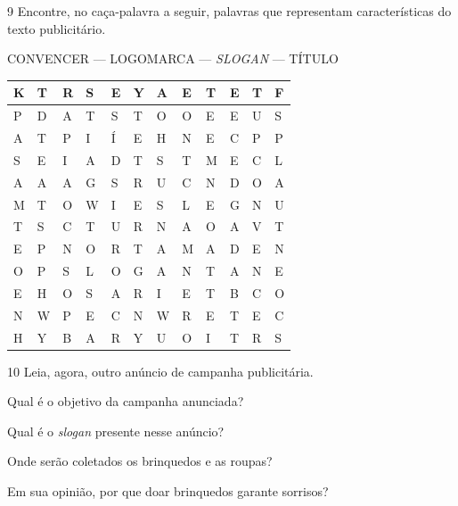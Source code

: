 \num{9} Encontre, no caça-palavra a seguir, palavras que representam
características do texto publicitário.

CONVENCER --- LOGOMARCA --- \textit{SLOGAN} --- TÍTULO

\begin{longtable}[]{@{}llllllllllll@{}}
\toprule
K & T & R & S & E & Y & A & E & T & E & T & F\tabularnewline
\midrule
\endhead
P & D & A & T & S & T & O & O & E & E & U & S\tabularnewline
A & T & P & I & Í & E & H & N & E & C & P & P\tabularnewline
S & E & I & A & D & T & S & T & M & E & C & L\tabularnewline
A & A & A & G & S & R & U & C & N & D & O & A\tabularnewline
M & T & O & W & I & E & S & L & E & G & N & U\tabularnewline
T & S & C & T & U & R & N & A & O & A & V & T\tabularnewline
E & P & N & O & R & T & A & M & A & D & E & N\tabularnewline
O & P & S & L & O & G & A & N & T & A & N & E\tabularnewline
E & H & O & S & A & R & I & E & T & B & C & O\tabularnewline
N & W & P & E & C & N & W & R & E & T & E & C\tabularnewline
H & Y & B & A & R & Y & U & O & I & T & R & S\tabularnewline
\bottomrule
\end{longtable}

\num{10} Leia, agora, outro anúncio de campanha publicitária.


\begin{escolha}
\item Qual é o objetivo da campanha anunciada?


\item Qual é o \textit{slogan} presente nesse anúncio?


\item Onde serão coletados os brinquedos e as roupas?


\item Em sua opinião, por que doar brinquedos garante sorrisos?

\end{escolha}

